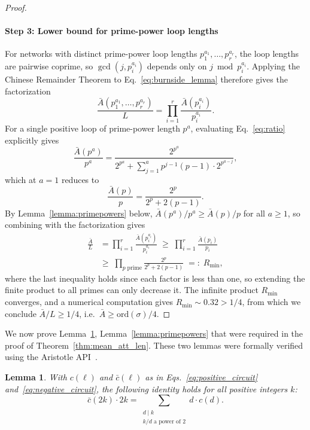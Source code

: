\documentclass[11pt, reqno]{elsarticle}%
\theoremstyle{plain}
\newtheorem{lemma}[thm]{Lemma}
\begin{document}
\begin{proof}
\paragraph{Step 3: Lower bound for prime-power loop lengths}
For networks with distinct prime-power loop lengths 
$p_1^{a_1},\ldots,p_r^{a_r}$, the loop lengths are pairwise 
coprime, so $\gcd(j, p_i^{a_i})$ depends only on $j \bmod p_i^{a_i}$. 
Applying the Chinese Remainder Theorem to 
Eq.~\eqref{eq:burnside_lemma} therefore gives the factorization
\begin{equation}
  \frac{\bar{A}(p_1^{a_1},\ldots,p_r^{a_r})}{L}
  = \prod_{i=1}^r \frac{\bar{A}(p_i^{a_i})}{p_i^{a_i}}.
\end{equation}
For a single positive loop of prime-power length $p^a$, 
evaluating Eq.~\eqref{eq:ratio} explicitly gives
\begin{equation}
\frac{\bar{A}(p^a)}{p^a}
= \frac{2^{p^a}}{2^{p^a} + \sum_{j=1}^{a} p^{j-1}(p-1)\cdot 
2^{p^{a-j}}},
\label{eq:ratio_pk}
\end{equation}
which at $a=1$ reduces to
\begin{equation}
\frac{\bar{A}(p)}{p}
= \frac{2^p}{2^p + 2(p-1)}.
\label{eq:ratio_prime}
\end{equation}
By Lemma~\ref{lemma:primepowers} below, $\bar{A}(p^a)/p^a \ge \bar{A}(p)/p$ for all 
$a \ge 1$, so combining with the factorization gives
\begin{align}
  \frac{\bar{A}}{L}
  &= \prod_{i=1}^r \frac{\bar{A}(p_i^{a_i})}{p_i^{a_i}}
  \;\ge\;
  \prod_{i=1}^r \frac{\bar{A}(p_i)}{p_i}
  \;\\&\ge\;
  \prod_{p\;\text{prime}} \frac{2^p}{2^p+2(p-1)}
  \;=:\; R_{\min},
\end{align}
where the last inequality holds since each factor is less than 
one, so extending the finite product to all primes can only 
decrease it. The infinite product $R_{\min}$ converges, and a 
numerical computation gives $R_{\min} \sim 0.32 > 1/4$, from which we conclude $\bar{A}/L \ge 1/4$, 
i.e.\ $\bar{A} \ge \mathrm{ord}(\sigma)/4$. 

\end{proof}

We now prove Lemma~\ref{lemma:positivereduction}, Lemma~\ref{lemma:primepowers} that were required in the proof of Theorem~\ref{thm:mean_att_len}. These two lemmas were formally verified using the Aristotle API~\cite{aristole}.
\begin{lemma}\label{lemma:positivereduction}
   With $c(\ell)$ and $\bar{c}(\ell)$ as in 
Eqs.~\eqref{eq:positive_circuit} and~\eqref{eq:negative_circuit}, 
the following identity holds for all positive integers $k$:
\begin{equation}
  \bar{c}(2k)\cdot 2k = \sum_{\substack{d\mid k\\\text{$k/d$ 
  a power of 2}}} d\cdot c(d).
  \label{eq:break2mcycles}
\end{equation} 
\end{lemma}
\end{document}
